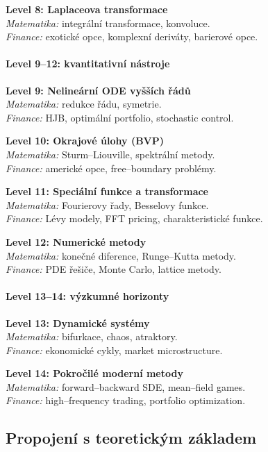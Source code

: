 \medskip
\textbf{Level 8: Laplaceova transformace}\\
\emph{Matematika:} integrální transformace, konvoluce.\\
\emph{Finance:} exotické opce, komplexní deriváty, barierové opce.

\spc

\paragraph{Level 9--12: kvantitativní nástroje}
\textbf{Level 9: Nelineární ODE vyšších řádů}\\
\emph{Matematika:} redukce řádu, symetrie.\\
\emph{Finance:} HJB, optimální portfolio, stochastic control.

\medskip
\textbf{Level 10: Okrajové úlohy (BVP)}\\
\emph{Matematika:} Sturm--Liouville, spektrální metody.\\
\emph{Finance:} americké opce, free--boundary problémy.

\medskip
\textbf{Level 11: Speciální funkce a transformace}\\
\emph{Matematika:} Fourierovy řady, Besselovy funkce.\\
\emph{Finance:} Lévy modely, FFT pricing, charakteristické funkce.

\medskip
\textbf{Level 12: Numerické metody}\\
\emph{Matematika:} konečné diference, Runge--Kutta metody.\\
\emph{Finance:} PDE řešiče, Monte Carlo, lattice metody.

\spc

\paragraph{Level 13--14: výzkumné horizonty}
\textbf{Level 13: Dynamické systémy}\\
\emph{Matematika:} bifurkace, chaos, atraktory.\\
\emph{Finance:} ekonomické cykly, market microstructure.

\medskip
\textbf{Level 14: Pokročilé moderní metody}\\
\emph{Matematika:} forward--backward SDE, mean--field games.\\
\emph{Finance:} high--frequency trading, portfolio optimization.

\spc

\subsection{Propojení s teoretickým základem}
\label{sec:propojeni-s-teorii}

